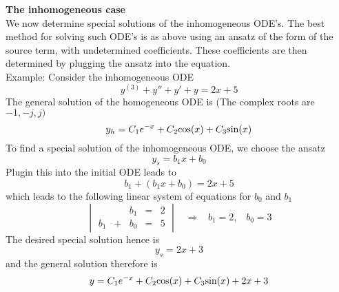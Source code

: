 \textbf{The inhomogeneous case}\\
We now determine special solutions of the inhomogeneous ODE's. The best method for solving such ODE's is as above using an ansatz of the form of the source term, with undetermined coefficients. These coefficients are then determined by plugging the ansatz into the equation.\\
Example: Consider the inhomogeneous ODE
\begin{equation}
  y^{(3)} + y'' + y' + y = 2x + 5
\end{equation}
The general solution of the homogeneous ODE is (The complex roots are $-1, -j, j)$
\begin{equation}
  y_h = C_1 e^{-x} + C_2\textup{cos}(x) + C_3 \textup{sin}(x)
\end{equation}
To find a special solution of the inhomogeneous ODE, we choose the ansatz
\begin{equation}
  y_s = b_1x + b_0
\end{equation}
Plugin this into the initial ODE leads to
\begin{equation}
  b_1 + (b_1x + b_0) = 2x + 5
\end{equation}
which leads to the following linear system of equations for $b_0$ and $b_1$
\begin{equation}
  \begin{vmatrix}
        &   & b_1 & = & 2\\
    b_1 & + & b_0 & = & 5
  \end{vmatrix}
  \;\;\; \Rightarrow \;\;\;
  b_1 = 2, \;\;\; b_0 = 3
\end{equation}
The desired special solution hence is
\begin{equation}
  y_s = 2x + 3
\end{equation}
and the general solution therefore is
\begin{equation}
  y = C_1 e^{-x} + C_2\textup{cos}(x) + C_3 \textup{sin}(x) + 2x + 3
\end{equation}

